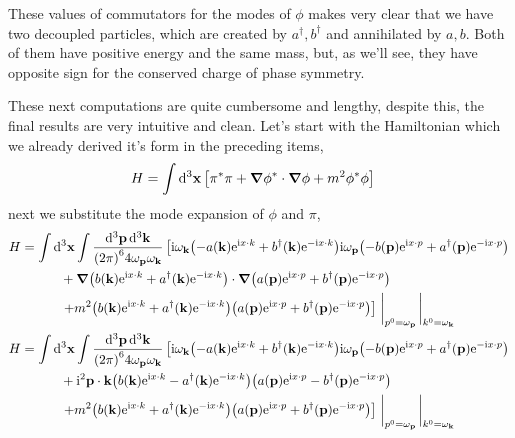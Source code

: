 These values of commutators for the modes of $\phi$ makes very clear that we have two decoupled particles, which are created by $a^\dagger,b^\dagger$ and annihilated by 
$a,b$. Both of them have positive energy and the same mass, but, as we'll see, they have opposite sign for the conserved charge of phase symmetry.

\probitem{}
\label{section:e}

These next computations are quite cumbersome and lengthy, despite this, the final results are very intuitive and clean. Let's start with the Hamiltonian which we already derived it's form in the preceding 
items,
\begin{align}
    H&=\int\dd[3]{\vb x}\qty[\pi^\ast\pi+\grad\phi^\ast\cdot\grad\phi +m^2\phi^\ast\phi]
\end{align}
next we substitute the mode expansion of $\phi$ and $\pi$,
\begin{align}
    H&=\int\dd[3]{\vb x}\int\frac{\dd[3]{\vb p}\dd[3]{\vb k}}{\qty(2\pi)^64\omega_{\vb p}\omega_{\vb k}}\left[\im\omega_{\vb k}\qty(-a\qty(\vb k)\e^{\im x\cdot k}+b^\dagger\qty(\vb k)\e^{-\im x\cdot k})\im\omega_{\vb p}\qty(-b\qty(\vb p)\e^{\im x\cdot p}+a^\dagger\qty(\vb p)\e^{-\im x\cdot p})\right.\nonumber\\
    &\quad\quad\quad+\grad\qty(b\qty(\vb k)\e^{\im x\cdot k}+a^\dagger\qty(\vb k)\e^{-\im x\cdot k})\cdot\grad\qty(a\qty(\vb p)\e^{\im x\cdot p}+b^\dagger\qty(\vb p)\e^{-\im x\cdot p})\nonumber\\
    &\quad\quad\quad\left.+m^2\qty(b\qty(\vb k)\e^{\im x\cdot k}+a^\dagger\qty(\vb k)\e^{-\im x\cdot k})\qty(a\qty(\vb p)\e^{\im x\cdot p}+b^\dagger\qty(\vb p)\e^{-\im x\cdot p})\right]\eval_{p^0=\omega_{\vb p}}\eval_{k^0=\omega_{\vb k}}\\
    H&=\int\dd[3]{\vb x}\int\frac{\dd[3]{\vb p}\dd[3]{\vb k}}{\qty(2\pi)^64\omega_{\vb p}\omega_{\vb k}}\left[\im\omega_{\vb k}\qty(-a\qty(\vb k)\e^{\im x\cdot k}+b^\dagger\qty(\vb k)\e^{-\im x\cdot k})\im\omega_{\vb p}\qty(-b\qty(\vb p)\e^{\im x\cdot p}+a^\dagger\qty(\vb p)\e^{-\im x\cdot p})\right.\nonumber\\
    &\quad\quad\quad+\im^2\vb p\cdot \vb k\qty(b\qty(\vb k)\e^{\im x\cdot k}-a^\dagger\qty(\vb k)\e^{-\im x\cdot k})\qty(a\qty(\vb p)\e^{\im x\cdot p}-b^\dagger\qty(\vb p)\e^{-\im x\cdot p})\nonumber\\
    &\quad\quad\quad\left.+m^2\qty(b\qty(\vb k)\e^{\im x\cdot k}+a^\dagger\qty(\vb k)\e^{-\im x\cdot k})\qty(a\qty(\vb p)\e^{\im x\cdot p}+b^\dagger\qty(\vb p)\e^{-\im x\cdot p})\right]\eval_{p^0=\omega_{\vb p}}\eval_{k^0=\omega_{\vb k}}
\end{align}
